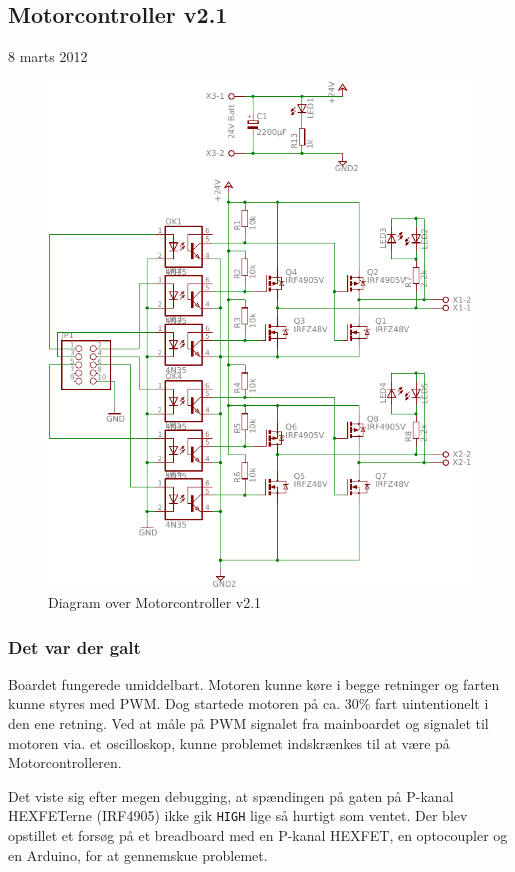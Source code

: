 \documentclass[a4paper,oneside,article,danish,table]{memoir}
\newcommand{\boarddate}[1]{\textcolor{blue!80!black}{#1}}
\begin{document}
\subsection{Motorcontroller v2.1}
\boarddate{8 marts 2012}
\begin{figure}[htbp]
  \centering
  \includegraphics[width=\textwidth]{pictures/MotorcontrollerSch2-1.pdf}
  \caption{Diagram over Motorcontroller v2.1}
  \label{fig:mosch2.1}
\end{figure}
\subsubsection{Det var der galt}
\label{sec:Motorcontroller2.1}
Boardet fungerede umiddelbart. Motoren kunne køre i begge retninger og farten kunne styres med PWM. Dog startede motoren på ca. 30\% fart uintentionelt i den ene retning. Ved at måle på PWM signalet fra mainboardet og signalet til motoren via. et oscilloskop, kunne problemet indskrænkes til at være på Motorcontrolleren.

Det viste sig efter megen debugging, at spændingen på gaten på P-kanal HEXFETerne (IRF4905) ikke gik \texttt{HIGH} lige så hurtigt som ventet. Der blev opstillet et forsøg på et breadboard med en P-kanal HEXFET, en optocoupler og en Arduino, for at gennemskue problemet.
\end{document}
